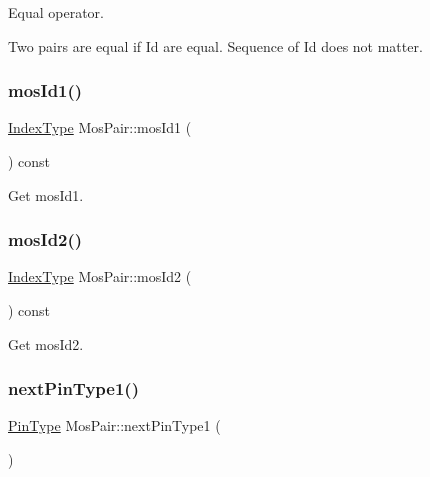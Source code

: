 Equal operator. 

Two pairs are equal if Id are equal. Sequence of Id does not matter. \mbox{\label{classMosPair_a324d89c99656159e6882e6f9701f0efe}} 
\subsubsection{\texorpdfstring{mos\+Id1()}{mosId1()}}
{\footnotesize\ttfamily \hyperlink{type_8h_a581e8093e28e7362f2b6937296190676}{Index\+Type} Mos\+Pair\+::mos\+Id1 (\begin{DoxyParamCaption}{ }\end{DoxyParamCaption}) const\hspace{0.3cm}{\ttfamily [inline]}}



Get mos\+Id1. 

\mbox{\label{classMosPair_a08f2d371ecad665d546bef76c45e2665}} 
\subsubsection{\texorpdfstring{mos\+Id2()}{mosId2()}}
{\footnotesize\ttfamily \hyperlink{type_8h_a581e8093e28e7362f2b6937296190676}{Index\+Type} Mos\+Pair\+::mos\+Id2 (\begin{DoxyParamCaption}{ }\end{DoxyParamCaption}) const\hspace{0.3cm}{\ttfamily [inline]}}



Get mos\+Id2. 

\mbox{\label{classMosPair_a533ead636fe63d9b3b9deed09e14a3b3}} 
\subsubsection{\texorpdfstring{next\+Pin\+Type1()}{nextPinType1()}}
{\footnotesize\ttfamily \hyperlink{type_8h_afaab50027002ecbb6c8ac27e727d1bb4}{Pin\+Type} Mos\+Pair\+::next\+Pin\+Type1 (\begin{DoxyParamCaption}{ }\end{DoxyParamCaption})\hspace{0.3cm}{\ttfamily [inline]}}



